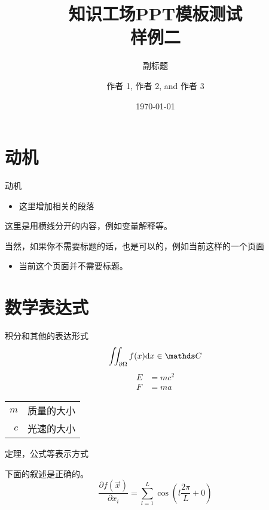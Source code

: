 \documentclass{kw}
\title[副标题]{知识工场PPT模板测试\\样例二}
\subtitle{副标题}
\author{作者 1\inst{1}, 作者 2\inst{1}, and 作者 3\inst{2}}
\institute[]{%
	\inst{1} 复旦大学知识工场实验室\\
	\inst{2} 复旦大学计算机科学与技术学院
}
\date{\today} %
\begin{document}
\begin{frame}[plain]
	\titlepage
\end{frame}

\section{动机}
\begin{frame}{动机}
	\begin{itemize}
		\item 这里增加相关的段落
	\end{itemize}
	
	\seprule
	
	这里是用横线分开的内容，例如变量解释等。
\end{frame}
\begin{frame}
	当然，如果你不需要标题的话，也是可以的，例如当前这样的一个页面
	\begin{itemize}
		\item 当前这个页面并不需要标题。
	\end{itemize}
\end{frame}

\section{数学表达式}
\begin{frame}{积分和其他的表达形式}
	\begin{equation}
		\iint_{\partial\Omega}f(x)\diff{x} \in \complexes
	\end{equation}
	\begin{align}
		E &= mc^2\\
		F &= ma
	\end{align}

	\seprule
	
	\begin{tabular}{rl}
		$m$ & 质量的大小\\
		$c$ & 光速的大小
	\end{tabular}
\end{frame}
\begin{frame}{定理，公式等表示方式}
	\begin{theorem}
		下面的叙述是正确的。
		\begin{equation}
			\frac{\partial f(\vec{x})}{\partial x_i} = \sum_{l=1}^{L}\cos\left(l\frac{2\pi}{L} + 0\right)
		\end{equation}
	\end{theorem}
\end{frame}
\end{document}
